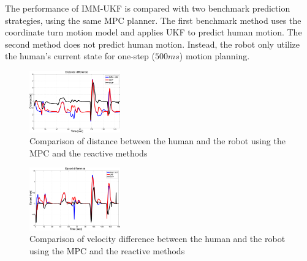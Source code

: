 \documentclass[letterpaper, 10 pt, conference]{ieeeconf}
\begin{document}
	The performance of IMM-UKF is compared with two benchmark prediction strategies, using the same MPC planner.
	The first benchmark method uses the coordinate turn motion model and applies UKF to predict human motion.
	The second method does not predict human motion.
	Instead, the robot only utilize the human's current state for one-step ($500ms$) motion planning.
	
	\begin{figure}
		\centering
		\includegraphics[width=0.35\textwidth]{figures/dis_diff2.pdf}
		\caption{Comparison of distance between the human and the robot using the MPC and the reactive methods}
		\label{fig:err_d}
	\end{figure}
	
	\begin{figure}
		\centering
		\includegraphics[width=0.35\textwidth]{figures/vel_diff2.pdf}
		\caption{Comparison of velocity difference between the human and the robot using the MPC and the reactive methods}
		\label{fig:err_v}
	\end{figure}
	
\end{document}
